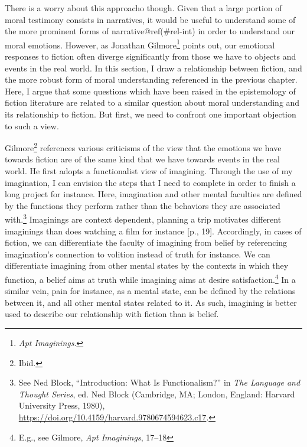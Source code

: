 \documentclass[phdthesis,12pt,final]{wuthesis}
\theoremstyle{definition}
\theoremstyle{definition}
\theoremstyle{definition}
\theoremstyle{definition}
\theoremstyle{remark}
\begin{document}
There is a worry about this approacho though. Given that a large portion of moral testimony consists in narratives, it would be useful to understand some of the more prominent forms of narrative@ref(\#rel-int) in order to understand our moral emotions. However, as Jonathan Gilmore\footnote{\emph{Apt {Imaginings}}.} points out, our emotional responses to fiction often diverge significantly from those we have to objects and events in the real world. In this section, I draw a relationship between fiction, and the more robust form of moral understanding referenced in the previous chapter. Here, I argue that some questions which have been raised in the epistemology of fiction literature are related to a similar question about moral understanding and its relationship to fiction. But first, we need to confront one important objection to such a view.

Gilmore\footnote{Ibid.} references various criticisms of the view that the emotions we have towards fiction are of the same kind that we have towards events in the real world. He first adopts a functionalist view of imagining. Through the use of my imagination, I can envision the steps that I need to complete in order to finish a long project for instance. Here, imagination and other mental faculties are defined by the functions they perform rather than the behaviors they are associated with.\footnote{See Ned Block, {``Introduction: What Is Functionalism?''} in \emph{The {Language} and {Thought Series}}, ed. Ned Block (Cambridge, MA; London, England: Harvard University Press, 1980), \url{https://doi.org/10.4159/harvard.9780674594623.c17}.} Imaginings are context dependent, planning a trip motivates different imaginings than does watching a film for instance {[}p., 19{]}. Accordingly, in cases of fiction, we can differentiate the faculty of imagining from belief by referencing imagination's connection to volition instead of truth for instance. We can differentiate imagining from other mental states by the contexts in which they function, a belief aims at truth while imagining aims at desire satisfaction.\footnote{E.g., see Gilmore, \emph{Apt {Imaginings}}, 17--18} In a similar vein, pain for instance, as a mental state, can be defined by the relations between it, and all other mental states related to it. As such, imagining is better used to describe our relationship with fiction than is belief.
\end{document}
